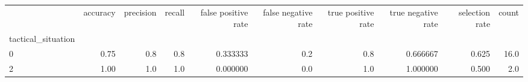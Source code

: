 \begin{tabular}{lrrrrrrrrr}
\toprule
{} &  accuracy &  precision &  recall &  false positive rate &  false negative rate &  true positive rate &  true negative rate &  selection rate &  count \\
tactical\_situation &           &            &         &                      &                      &                     &                     &                 &        \\
\midrule
0                  &      0.75 &        0.8 &     0.8 &             0.333333 &                  0.2 &                 0.8 &            0.666667 &           0.625 &   16.0 \\
2                  &      1.00 &        1.0 &     1.0 &             0.000000 &                  0.0 &                 1.0 &            1.000000 &           0.500 &    2.0 \\
\bottomrule
\end{tabular}
